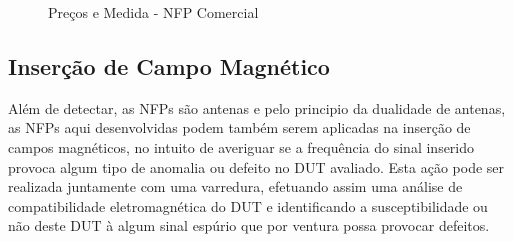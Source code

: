 \begin{figure}[htb!]
	\centering
 	\caption{Preços e Medida - NFP Comercial}
\end{figure}

\subsection{Inserção de Campo Magnético}
Além de detectar, as NFPs são antenas e pelo principio da dualidade de antenas, as NFPs aqui desenvolvidas podem também serem aplicadas na inserção de campos magnéticos, no intuito de averiguar se a frequência do sinal inserido provoca algum tipo de anomalia ou defeito no DUT avaliado. Esta ação pode ser realizada juntamente com uma varredura, efetuando assim uma análise de compatibilidade eletromagnética do DUT e identificando a susceptibilidade ou não deste DUT à algum sinal espúrio que por ventura possa provocar defeitos.

